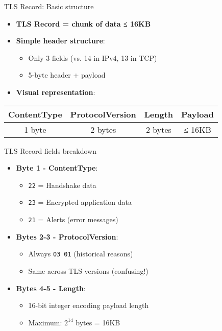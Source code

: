 \documentclass[aspectratio=169, lualatex, handout]{beamer}
\begin{document}
\begin{frame}{TLS Record: Basic structure}
	\begin{itemize}[<+->]
		\item \textbf{TLS Record = chunk of data ≤ 16KB}
		\item \textbf{Simple header structure}:
		      \begin{itemize}
			      \item Only 3 fields (vs. 14 in IPv4, 13 in TCP)
			      \item 5-byte header + payload
		      \end{itemize}
		\item \textbf{Visual representation}:
	\end{itemize}
	\pause
	\begin{center}
		\begin{tabular}{|c|c|c|c|}
			\hline
			\textbf{ContentType} & \textbf{ProtocolVersion} & \textbf{Length} & \textbf{Payload} \\
			\hline
			1 byte               & 2 bytes                  & 2 bytes         & ≤ 16KB           \\
			\hline
		\end{tabular}
	\end{center}
\end{frame}

\begin{frame}{TLS Record fields breakdown}
	\begin{itemize}[<+->]
		\item \textbf{Byte 1 - ContentType}:
		      \begin{itemize}
			      \item \texttt{22} = Handshake data
			      \item \texttt{23} = Encrypted application data
			      \item \texttt{21} = Alerts (error messages)
		      \end{itemize}
		\item \textbf{Bytes 2-3 - ProtocolVersion}:
		      \begin{itemize}
			      \item Always \texttt{03 01} (historical reasons)
			      \item Same across TLS versions (confusing!)
		      \end{itemize}
		\item \textbf{Bytes 4-5 - Length}:
		      \begin{itemize}
			      \item 16-bit integer encoding payload length
			      \item Maximum: $2^{14}$ bytes = 16KB
		      \end{itemize}
	\end{itemize}
\end{frame}
\end{document}
